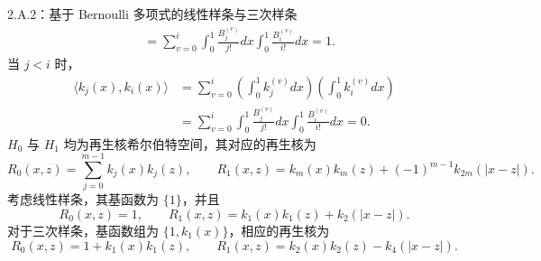 \begin{bookexample}{2.A.2：基于 Bernoulli 多项式的线性样条与三次样条}
\[\begin{aligned}
 &=\sum_{v=0}^i\int_0^1\frac{B_j^{(v)}}{j!}dx
                  \int_0^1\frac{B_i^{(v)}}{i!}dx=1.
\end{aligned}
\]
当 $j<i$ 时，
\[
\begin{aligned}
\langle k_j(x),k_i(x)\rangle
 &=\sum_{v=0}^i
   \left(\int_0^1k_j^{(v)}dx\right)
   \left(\int_0^1k_i^{(v)}dx\right)\\
 &=\sum_{v=0}^i\int_0^1\frac{B_j^{(v)}}{j!}dx
                  \int_0^1\frac{B_i^{(v)}}{i!}dx=0.
\end{aligned}
\]
$H_0$ 与 $H_1$ 均为再生核希尔伯特空间，其对应的再生核为
\[
R_0(x,z)=\sum_{j=0}^{m-1}k_j(x)k_j(z),
\qquad
R_1(x,z)=k_m(x)k_m(z)+(-1)^{m-1}k_{2m}(|x-z|).
\]
考虑线性样条，其基函数为 $\{1\}$，并且
\[
R_0(x,z)=1,\qquad
R_1(x,z)=k_1(x)k_1(z)+k_2(|x-z|).
\]
对于三次样条，基函数组为 $\{1,k_1(x)\}$，相应的再生核为
\[
R_0(x,z)=1+k_1(x)k_1(z),
\qquad
R_1(x,z)=k_2(x)k_2(z)-k_4(|x-z|).
\]
\end{bookexample}

